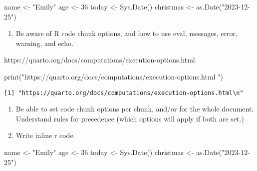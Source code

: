 \documentclass[
  letterpaper,
  DIV=11,
  numbers=noendperiod]{scrartcl}
\newenvironment{Shaded}{\begin{snugshade}}{\end{snugshade}}
\newcommand{\DecValTok}[1]{\textcolor[rgb]{0.68,0.00,0.00}{#1}}
\newcommand{\FunctionTok}[1]{\textcolor[rgb]{0.28,0.35,0.67}{#1}}
\newcommand{\NormalTok}[1]{\textcolor[rgb]{0.00,0.23,0.31}{#1}}
\newcommand{\OtherTok}[1]{\textcolor[rgb]{0.00,0.23,0.31}{#1}}
\newcommand{\StringTok}[1]{\textcolor[rgb]{0.13,0.47,0.30}{#1}}
\providecommand{\tightlist}{%
  \setlength{\itemsep}{0pt}\setlength{\parskip}{0pt}}\usepackage{longtable,booktabs,array}
\begin{document}
\begin{Shaded}
\begin{Highlighting}[]
\NormalTok{name }\OtherTok{\textless{}{-}} \StringTok{"Emily"}
\NormalTok{age }\OtherTok{\textless{}{-}} \DecValTok{36}
\NormalTok{today }\OtherTok{\textless{}{-}} \FunctionTok{Sys.Date}\NormalTok{()}
\NormalTok{christmas }\OtherTok{\textless{}{-}} \FunctionTok{as.Date}\NormalTok{(}\StringTok{"2023{-}12{-}25"}\NormalTok{)}
\end{Highlighting}
\end{Shaded}

\begin{enumerate}
\def\labelenumi{\arabic{enumi}.}
\setcounter{enumi}{7}
\tightlist
\item
  Be aware of R code chunk options, and how to use eval, messages,
  error, warning, and echo.
\end{enumerate}

https://quarto.org/docs/computations/execution-options.html

\begin{Shaded}
\begin{Highlighting}[]
\FunctionTok{print}\NormalTok{(}\StringTok{"https://quarto.org/docs/computations/execution{-}options.html}
\StringTok{"}\NormalTok{)}
\end{Highlighting}
\end{Shaded}

\begin{verbatim}
[1] "https://quarto.org/docs/computations/execution-options.html\n"
\end{verbatim}

\begin{enumerate}
\def\labelenumi{\arabic{enumi}.}
\setcounter{enumi}{8}
\item
  Be able to set code chunk options per chunk, and/or for the whole
  document. Understand rules for precedence (which options will apply if
  both are set.)
\item
  Write inline r code.
\end{enumerate}

\begin{Shaded}
\begin{Highlighting}[]
\NormalTok{name }\OtherTok{\textless{}{-}} \StringTok{"Emily"}
\NormalTok{age }\OtherTok{\textless{}{-}} \DecValTok{36}
\NormalTok{today }\OtherTok{\textless{}{-}} \FunctionTok{Sys.Date}\NormalTok{()}
\NormalTok{christmas }\OtherTok{\textless{}{-}} \FunctionTok{as.Date}\NormalTok{(}\StringTok{"2023{-}12{-}25"}\NormalTok{)}
\end{Highlighting}
\end{Shaded}
\end{document}
